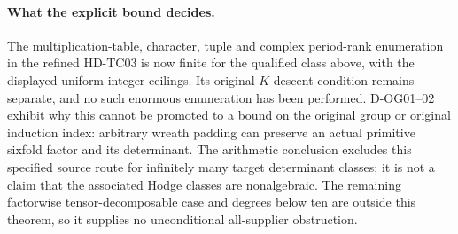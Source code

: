 \paragraph{What the explicit bound decides.}
The multiplication-table, character, tuple and complex period-rank
enumeration in the refined HD-TC03 is now finite for the qualified
class above, with the displayed uniform integer ceilings.
Its original-$K$ descent condition remains separate, and no such
enormous enumeration has been performed.
D-OG01--02 exhibit why this cannot be promoted to a bound on the
original group or original induction index: arbitrary wreath padding
can preserve an actual primitive sixfold factor and its determinant.
The arithmetic conclusion excludes this specified source route for
infinitely many target determinant classes; it is not a claim that
the associated Hodge classes are nonalgebraic.
The remaining factorwise tensor-decomposable case and degrees below
ten are outside this theorem, so it supplies no unconditional
all-supplier obstruction.
